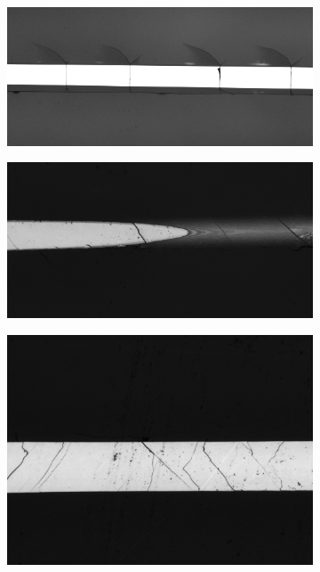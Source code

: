 \begin{figure}[h]
\centering
\begin{subfigure}{.7\textwidth}
  \centering
  \includegraphics[width=\linewidth]{fig/polishing/Siedit.jpg}
  \label{fig:sfig1}
\end{subfigure}%

\begin{subfigure}{.7\textwidth}
  \centering
  \includegraphics[width=\linewidth]{fig/polishing/SiGe.jpg}
  \label{fig:sfig2}
\end{subfigure}%

\begin{subfigure}{.7\textwidth}
  \centering
  \includegraphics[width=\linewidth]{fig/polishing/SiGe2.jpg}
  \label{fig:sfig3}
\end{subfigure}
\caption{}
\label{fig:si_sige}
\end{figure}


